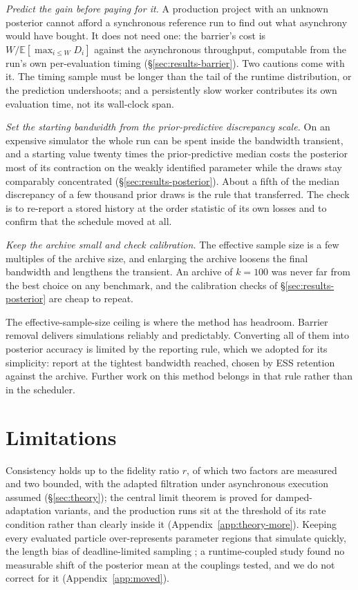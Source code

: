 \documentclass[pdflatex,sn-mathphys-num]{sn-jnl}
\theoremstyle{plain}
\theoremstyle{definition}
\begin{document}
\emph{Predict the gain before paying for it.} A production project with an unknown posterior cannot afford a synchronous reference run to find out what asynchrony would have bought. It does not need one: the barrier's cost is $W/\mathbb{E}[\max_{i\le W}D_i]$ against the asynchronous throughput, computable from the run's own per-evaluation timing (\S\ref{sec:results-barrier}). Two cautions come with it. The timing sample must be longer than the tail of the runtime distribution, or the prediction undershoots; and a persistently slow worker contributes its own evaluation time, not its wall-clock span.

\emph{Set the starting bandwidth from the prior-predictive discrepancy scale.} On an expensive simulator the whole run can be spent inside the bandwidth transient, and a starting value twenty times the prior-predictive median costs the posterior most of its contraction on the weakly identified parameter while the draws stay comparably concentrated (\S\ref{sec:results-posterior}). About a fifth of the median discrepancy of a few thousand prior draws is the rule that transferred. The check is to re-report a stored history at the order statistic of its own losses and to confirm that the schedule moved at all.

\emph{Keep the archive small and check calibration.} The effective sample size is a few multiples of the archive size, and enlarging the archive loosens the final bandwidth and lengthens the transient. An archive of $k=100$ was never far from the best choice on any benchmark, and the calibration checks of \S\ref{sec:results-posterior} are cheap to repeat.

The effective-sample-size ceiling is where the method has headroom. Barrier removal delivers simulations reliably and predictably. Converting all of them into posterior accuracy is limited by the reporting rule, which we adopted for its simplicity: report at the tightest bandwidth reached, chosen by ESS retention against the archive. Further work on this method belongs in that rule rather than in the scheduler.

\section{Limitations}\label{sec:limitations}
Consistency holds up to the fidelity ratio $r$, of which two factors are measured and two bounded, with the adapted filtration under asynchronous execution assumed (\S\ref{sec:theory}); the central limit theorem is proved for damped-adaptation variants, and the production runs sit at the threshold of its rate condition rather than clearly inside it (Appendix~\ref{app:theory-more}). Keeping every evaluated particle over-represents parameter regions that simulate quickly, the length bias of deadline-limited sampling \cite{murray2021anytime}; a runtime-coupled study found no measurable shift of the posterior mean at the couplings tested, and we do not correct for it (Appendix~\ref{app:moved}).
\end{document}
